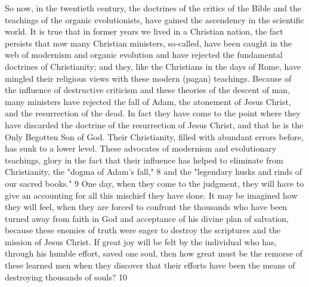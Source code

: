 So now, in the twentieth century, the doctrines of the critics of the Bible and the teachings of
the organic evolutionists, have gained the ascendency in the scientific world. It is true that in
former years we lived in a Christian nation, the fact persists that now many Christian
ministers, so-called, have been caught in the web of modernism and organic evolution and
have rejected the fundamental doctrines of Christianity; and they, like the Christians in the
days of Rome, have mingled their religious views with these modern (pagan) teachings.
Because of the influence of destructive criticism and these theories of the descent of man,
many ministers have rejected the fall of Adam, the atonement of Jesus Christ, and the
resurrection of the dead. In fact they have come to the point where they have discarded the
doctrine of the resurrection of Jesus Christ, and that he is the Only Begotten Son of God.
Their Christianity, filled with abundant errors before, has sunk to a lower level. These
advocates of modernism and evolutionary teachings, glory in the fact that their influence has
helped to eliminate from Christianity, the "dogma of Adam's fall," 8 and the "legendary
husks and rinds of our sacred books." 9 One day, when they come to the judgment, they will
have to give an accounting for all this mischief they have done. It may be imagined how they
will feel, when they are forced to confront the thousands who have been turned away from
faith in God and acceptance of his divine plan of salvation, because these enemies of truth
were eager to destroy the scriptures and the mission of Jesus Christ. If great joy will be felt
by the individual who has, through his humble effort, saved one soul, then how great must be
the remorse of these learned men when they discover that their efforts have been the means
of destroying thousands of souls? 10

